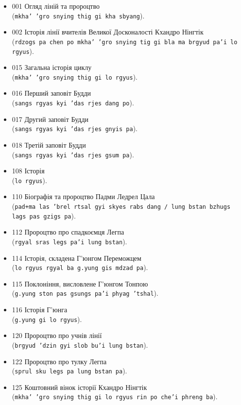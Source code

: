 \documentclass{article}
\begin{document}
\begingroup\raggedright
\begin{itemize}
\item 001 Огляд ліній та пророцтво \\ (\texttt{mkha' 'gro snying thig gi kha sbyang}).
\item 002 Історія лінії вчителів Великої Досконалості Кхандро Нінгтік \\ (\texttt{rdzogs pa chen po mkha' 'gro snying tig gi bla ma brgyud pa'i lo rgyus}).
\item 015 Загальна історія циклу \\ (\texttt{mkha' 'gro snying thig gi lo rgyus}).
\item 016 Перший заповіт Будди \\ (\texttt{sangs rgyas kyi 'das rjes dang po}).
\item 017 Другий заповіт Будди \\ (\texttt{sangs rgyas kyi 'das rjes gnyis pa}).
\item 018 Третій заповіт Будди \\ (\texttt{sangs rgyas kyi 'das rjes gsum pa}).
\item 108 Історія \\ (\texttt{lo rgyus}).
\item 110 Біографія та пророцтво Падми Ледрел Цала \\ (\texttt{pad+ma las 'brel rtsal gyi skyes rabs dang / lung bstan bzhugs lags pas gzigs pa}).
\item 112 Пророцтво про спадкоємця Легпа \\ (\texttt{rgyal sras legs pa'i lung bstan}).
\item 114 Історія, складена Г’юнгом Переможцем \\ (\texttt{lo rgyus rgyal ba g.yung gis mdzad pa}).
\item 115 Поклоніння, висловлене Г’юнгом Тонпою \\ (\texttt{g.yung ston pas gsungs pa'i phyag 'tshal}).
\item 116 Історія Г’юнга \\ (\texttt{g.yung gi lo rgyus}).
\item 120 Пророцтво про учнів лінії \\ (\texttt{brgyud 'dzin gyi slob bu'i lung bstan}).
\item 122 Пророцтво про тулку Легпа \\ (\texttt{sprul sku legs pa lung bstan pa}).
\item 125 Коштовний вінок історії Кхандро Нінгтік \\ (\texttt{mkha' 'gro snying thig gi lo rgyus rin po che'i phreng ba}).
\end{itemize}
\endgroup
\end{document}
